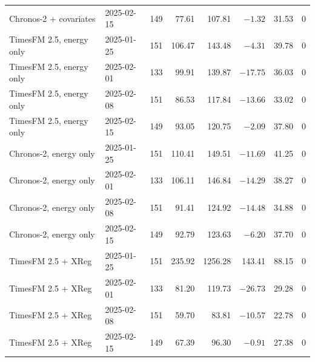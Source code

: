 \begin{table}[!htbp]
\begin{tabular}{@{}llrrrrrr@{}}
Chronos-2 + covariates & 2025-02-15 & 149 & 77.61 & 107.81 & $-1.32$ & 31.53 & 0 \\
TimesFM 2.5, energy only & 2025-01-25 & 151 & 106.47 & 143.48 & $-4.31$ & 39.78 & 0 \\
TimesFM 2.5, energy only & 2025-02-01 & 133 & 99.91 & 139.87 & $-17.75$ & 36.03 & 0 \\
TimesFM 2.5, energy only & 2025-02-08 & 151 & 86.53 & 117.84 & $-13.66$ & 33.02 & 0 \\
TimesFM 2.5, energy only & 2025-02-15 & 149 & 93.05 & 120.75 & $-2.09$ & 37.80 & 0 \\
Chronos-2, energy only & 2025-01-25 & 151 & 110.41 & 149.51 & $-11.69$ & 41.25 & 0 \\
Chronos-2, energy only & 2025-02-01 & 133 & 106.11 & 146.84 & $-14.29$ & 38.27 & 0 \\
Chronos-2, energy only & 2025-02-08 & 151 & 91.41 & 124.92 & $-14.48$ & 34.88 & 0 \\
Chronos-2, energy only & 2025-02-15 & 149 & 92.79 & 123.63 & $-6.20$ & 37.70 & 0 \\
TimesFM 2.5 + XReg & 2025-01-25 & 151 & 235.92 & 1256.28 & 143.41 & 88.15 & 0 \\
TimesFM 2.5 + XReg & 2025-02-01 & 133 & 81.20 & 119.73 & $-26.73$ & 29.28 & 0 \\
TimesFM 2.5 + XReg & 2025-02-08 & 151 & 59.70 & 83.81 & $-10.57$ & 22.78 & 0 \\
TimesFM 2.5 + XReg & 2025-02-15 & 149 & 67.39 & 96.30 & $-0.91$ & 27.38 & 0 \\
\bottomrule
\end{tabular}
\end{table}
